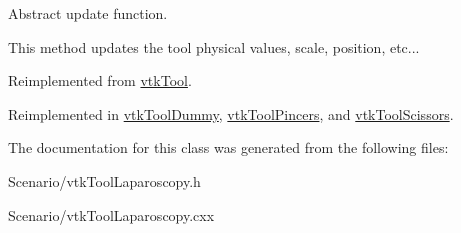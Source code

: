 Abstract update function. 

This method updates the tool physical values, scale, position, etc... 

Reimplemented from \hyperlink{classvtkTool_a0f1b6e049d7ff5420f4f4604434a9da7}{vtkTool}.



Reimplemented in \hyperlink{classvtkToolDummy_a19cda726ffda0a3955e519d7b42e4882}{vtkToolDummy}, \hyperlink{classvtkToolPincers_a57986aee2bcfa04472410cd7bf5c7929}{vtkToolPincers}, and \hyperlink{classvtkToolScissors_afe574b6b9e809f746308a157b6525c4b}{vtkToolScissors}.



The documentation for this class was generated from the following files:\begin{DoxyCompactItemize}
\item 
Scenario/vtkToolLaparoscopy.h\item 
Scenario/vtkToolLaparoscopy.cxx\end{DoxyCompactItemize}
